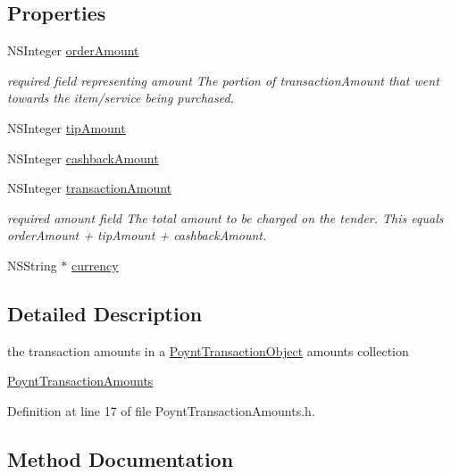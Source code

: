 \subsection*{Properties}
\begin{DoxyCompactItemize}
\item 
N\+S\+Integer \hyperlink{interface_poynt_transaction_amounts_a37e598d8b46c97a36f7fbb47e7b150ad}{order\+Amount}
\begin{DoxyCompactList}\small\item\em required field representing amount  The portion of transaction\+Amount that went towards the item/service being purchased. \end{DoxyCompactList}\item 
N\+S\+Integer \hyperlink{interface_poynt_transaction_amounts_ae4a2e64d79032bc8bb25305486b23859}{tip\+Amount}
\item 
N\+S\+Integer \hyperlink{interface_poynt_transaction_amounts_a865d904d3a3af78f51b64d9acd5d2076}{cashback\+Amount}
\item 
N\+S\+Integer \hyperlink{interface_poynt_transaction_amounts_aea3b857ebe452c1822cdd05e35cd2769}{transaction\+Amount}
\begin{DoxyCompactList}\small\item\em required amount field  The total amount to be charged on the tender. This equals order\+Amount + tip\+Amount + cashback\+Amount. \end{DoxyCompactList}\item 
N\+S\+String $\ast$ \hyperlink{interface_poynt_transaction_amounts_a71a9104f71558df8791cedc5e81941a3}{currency}
\end{DoxyCompactItemize}


\subsection{Detailed Description}
the transaction amounts in a \hyperlink{interface_poynt_transaction_object}{Poynt\+Transaction\+Object} amounts collection 

\hyperlink{interface_poynt_transaction_amounts}{Poynt\+Transaction\+Amounts} 

Definition at line 17 of file Poynt\+Transaction\+Amounts.\+h.



\subsection{Method Documentation}
\hypertarget{interface_poynt_transaction_amounts_a1c43473c035627846e64fddfb2bbe57d}{}\label{interface_poynt_transaction_amounts_a1c43473c035627846e64fddfb2bbe57d} 

